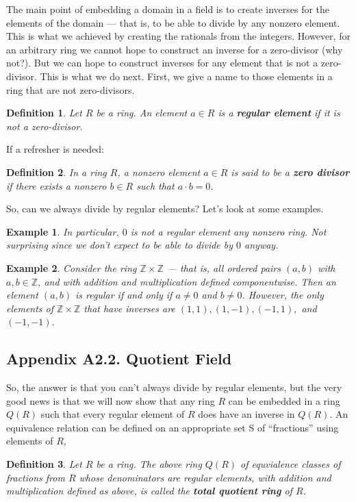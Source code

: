 \documentclass[12pt,reqno]{amsart}
\theoremstyle{plain}
\newtheorem{defi}{Definition}
\newtheorem{ex}{Example}
\newcommand{\zz}{\mathbb Z}
\begin{document}
The main point of embedding a domain in a field is to create inverses for the elements of the domain — that is, to be able to divide by any nonzero element. This is what we achieved by creating the rationals from the integers. However, for an arbitrary ring we cannot hope to construct an inverse for a zero-divisor (why not?). But we can hope to construct inverses for any element that is not a zero-divisor. This is what we do next. First, we give a name to those elements in a ring that are not zero-divisors.

\begin{defi} Let $R$ be a ring. An element $a \in R$ is a \textbf{regular element} if it is not a zero-divisor.
\end{defi} 

If a refresher is needed:
\begin{defi} In a ring $R$, a nonzero element $a\in R$ is said to be a \textbf{zero divisor} if there exists a nonzero $b \in R$ such that $a\cdot b = 0$.
\end{defi} 

 So, can we always divide by regular elements? Let's look at some examples.
 
\begin{ex} In particular, $0$ is not a regular element any nonzero ring. Not surprising since we don't expect to be able to divide by $0$ anyway. 
\end{ex} 
\begin{ex} Consider the ring $\zz \times \zz$ — that is, all ordered pairs $(a, b)$ with $a, b \in \zz$, and with addition and multiplication defined componentwise. Then an element $(a, b)$ is regular if and only if $a \neq 0$ and $b \neq 0$. However, the only elements of $\zz \times \zz$ that have inverses are $(1, 1), (1, -1), (-1, 1),$ and $(-1, -1)$.
\end{ex} 
\subsection{Appendix A2.2. Quotient Field}

So, the answer is that you can't always divide by regular elements, but the very good news is that we will now show that any ring $R$ can be embedded in a ring $Q(R)$ such that every regular element of $R$ does have an inverse in $Q(R)$. An equivalence relation can be defined on an appropriate set S of ``fractions” using elements of $R$,
\begin{defi}
Let $R$ be a ring. The above ring $Q(R)$ of equvialence classes of fractions from $R$ whose denominators are regular elements, with addition and multiplication defined as above, is called the \textbf{total quotient ring} of $R$.
\end{defi}
\end{document}
